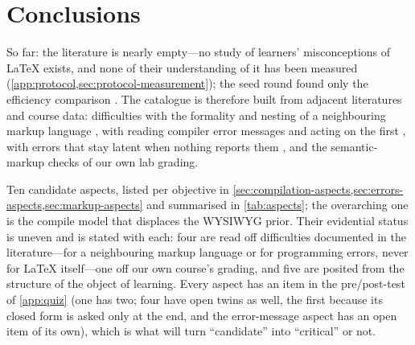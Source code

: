 \mode*
\section{Conclusions}


\rqmisconceptions*
So far: the literature is nearly empty---no study of learners'
misconceptions of LaTeX exists, and none of their understanding of it has
been measured (\cref{app:protocol,sec:protocol-measurement}); the seed
round found only the efficiency comparison \autocite{Knauff2014Latex}.
The catalogue is therefore built from adjacent literatures and course
data: difficulties with the formality and nesting of a neighbouring markup
language \autocite{Park2011WebDev,Park2016Hierarchies}, with reading
compiler error messages and acting on the first
\autocite{Becker2016CEM,Munson2016CompilerErrors,Prather2017Interaction},
with errors that stay latent when nothing reports them
\autocite{Park2015SyntaxErrors}, and the semantic-markup checks of our own
lab grading.

\rqaspects*
Ten candidate aspects, listed per objective in
\cref{sec:compilation-aspects,sec:errors-aspects,sec:markup-aspects}
and summarised in \cref{tab:aspects}; the overarching one is the compile
model that displaces the WYSIWYG prior.
Their evidential status is uneven and is stated with each: four are read
off difficulties documented in the literature---for a neighbouring markup
language or for programming errors, never for LaTeX itself---one off our
own course's grading, and five are posited from the structure of the
object of learning.
Every aspect has an item in the pre/post-test of \cref{app:quiz} (one has
two; four have open twins as well, the first because its closed form is
asked only at the end, and the error-message aspect has an open item of
its own), which is what will turn \enquote{candidate} into
\enquote{critical} or not.

